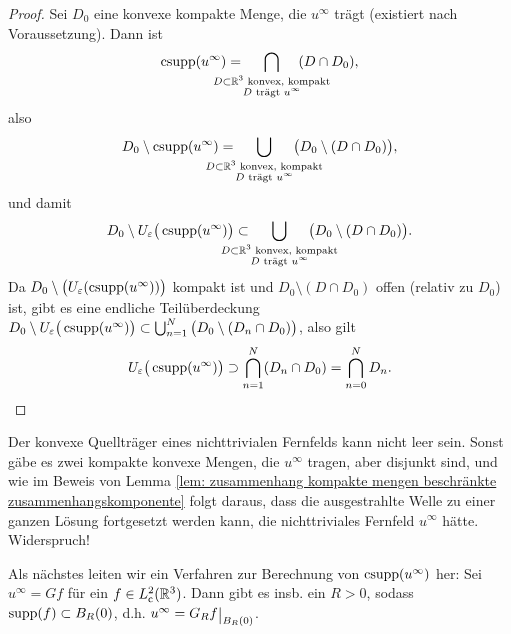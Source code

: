 \begin{proof}
	Sei \(D_0\) eine konvexe kompakte Menge, die \(u^\infty\) trägt (existiert nach Voraussetzung). Dann ist
	\begin{equation*}
		\csupp(u^\infty)=\hspace{-8mm}\bigcap_{\substack{D\subset\R^3\te{ konvex, kompakt}\\ D\te{ trägt }u^\infty}}\hspace{-8mm}(D\cap D_0),
	\end{equation*}
	also
	\begin{equation*}
		D_0\setminus\csupp(u^\infty)=\hspace{-8mm}\bigcup_{\substack{D\subset\R^3\te{ konvex, kompakt}\\ D\te{ trägt }u^\infty}}\hspace{-8mm}\big(D_0\setminus(D\cap D_0)\big),
	\end{equation*}
	und damit
	\begin{equation*}
		D_0\setminus U_\varepsilon\big(\csupp(u^\infty)\big)\subset \hspace{-8mm}\bigcup_{\substack{D\subset\R^3\te{ konvex, kompakt}\\ D\te{ trägt }u^\infty}}\hspace{-8mm}\big(D_0\setminus(D\cap D_0)\big).
	\end{equation*}
	Da \(D_0\setminus\big( U_\varepsilon(\operatorname{csupp}(u^\infty))\big)\) kompakt ist und \(D_0\setminus(D\cap D_0)\) offen (relativ zu \(D_0\)) ist, gibt es eine endliche Teilüberdeckung \(D_0\setminus U_\varepsilon\big(\operatorname{csupp}(u^\infty)\big)\subset\bigcup_{n=1}^N\big(D_0\setminus(D_n\cap D_0)\big)\), also gilt
	\begin{equation*}
		 U_\varepsilon\big(\operatorname{csupp}(u^\infty)\big)\supset\bigcap_{n=1}^N(D_n\cap D_0)=\bigcap_{n=0}^ND_n.
	\end{equation*}
\end{proof}
\begin{counter bem plain}
	Der konvexe Quellträger eines nichttrivialen Fernfelds kann nicht leer sein. Sonst gäbe es zwei kompakte konvexe Mengen, die \(u^\infty\) tragen, aber disjunkt sind, und wie im Beweis von Lemma \ref{lem: zusammenhang kompakte mengen beschränkte zusammenhangskomponente} folgt daraus, dass die ausgestrahlte Welle zu einer ganzen Lösung fortgesetzt werden kann, die nichttriviales Fernfeld \(u^\infty\) hätte. Widerspruch!
\end{counter bem plain}
Als nächstes leiten wir ein Verfahren zur Berechnung von \(\operatorname{csupp}(u^\infty)\) her: Sei \(u^\infty=Gf\) für ein \(f\in L_{\mathrm{c}}^2(\mathbb{R}^3)\). Dann gibt es insb. ein \(R>0\), sodass \(\operatorname{supp}(f)\subset B_R(0)\), d.h. \(u^\infty=G_Rf\restrict{B_R(0)}\).

